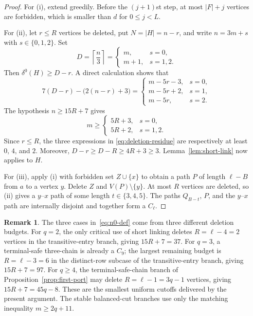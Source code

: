 \documentclass[11pt]{amsart}
\theoremstyle{definition}
\newtheorem{remark}[theorem]{Remark}
\begin{document}
\begin{proof}
For (i), extend greedily.  Before the $(j+1)$st step, at most $|F|+j$ vertices are forbidden, which is smaller than $d$ for $0\le j<L$.

For (ii), let $r\le R$ vertices be deleted, put $N=|H|=n-r$,
and write $n=3m+s$ with $s\in\{0,1,2\}$.  Set
\[
  D=\left\lceil\frac n3\right\rceil
  =\begin{cases}
     m,&s=0,\\
     m+1,&s=1,2.
   \end{cases}
\]
Then $\delta^0(H)\ge D-r$.  A direct calculation shows that
\begin{equation}\label{eq:deletion-residue}
7(D-r)-\bigl(2(n-r)+3\bigr)
=\begin{cases}
  m-5r-3,&s=0,\\
  m-5r+2,&s=1,\\
  m-5r,&s=2.
\end{cases}
\end{equation}
The hypothesis $n\ge15R+7$ gives
\[
  m\ge
  \begin{cases}
    5R+3,&s=0,\\
    5R+2,&s=1,2.
  \end{cases}
\]
Since $r\le R$, the three expressions in
\eqref{eq:deletion-residue} are respectively at least $0$, $4$, and
$2$.  Moreover, $D-r\ge D-R\ge4R+3\ge3$.
Lemma~\ref{lem:short-link} now applies to $H$.

For (iii), apply (i) with forbidden set $Z\cup\{x\}$ to obtain a path
$P$ of length $\ell-B$ from $a$ to a vertex $y$.  Delete $Z$ and
$V(P)\setminus\{y\}$.  At most $R$ vertices are deleted, so (ii)
gives a $y$--$x$ path of some length $t\in\{3,4,5\}$.  The paths
$Q_{B-t}$, $P$, and the $y$--$x$ path are internally disjoint and
together form a $C_\ell$.
\end{proof}

\begin{remark}\label{rem:constant-track}
The three cases in~\eqref{eq:n0-def} come from three different deletion
budgets.  For $q=2$, the only critical use of short linking deletes
$R=\ell-4=2$ vertices in the transitive-entry branch, giving
$15R+7=37$.  For $q=3$, a terminal-safe three-chain is already a
$C_9$; the largest remaining budget is $R=\ell-3=6$ in the
distinct-row subcase of the transitive-entry branch, giving
$15R+7=97$.  For $q\ge4$, the terminal-safe-chain branch of
Proposition~\ref{prop:first-port} may delete
$R=\ell-1=3q-1$ vertices, giving $15R+7=45q-8$.
These are the smallest uniform cutoffs delivered by the present
argument.  The stable balanced-cut branches use only the matching
inequality $m\ge2q+11$.
\end{remark}
\end{document}
